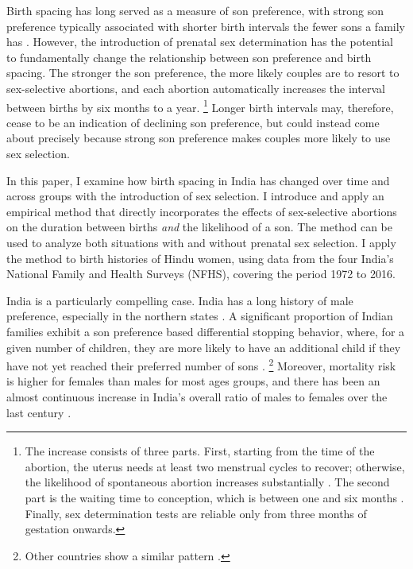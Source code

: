 \documentclass[12pt,letterpaper]{article}
\begin{document}
Birth spacing has long served as a measure of son preference, with strong
son preference typically associated with shorter birth intervals the
fewer sons a family has \citep{ben-porath76b,Leung1988}.
However, the introduction of prenatal sex determination has the potential to
fundamentally change the relationship between son preference and birth spacing.
The stronger the son preference, the more likely couples are to resort to sex-selective 
abortions, and each abortion automatically increases the interval between births by six 
months to a year.%
\footnote{
The increase consists of three parts.
First, starting from the time of the abortion, the uterus needs at 
least two menstrual cycles to recover;  otherwise, the likelihood 
of spontaneous abortion increases substantially \citep{zhou00b}.
The second part is the waiting time to conception, which is between 
one and six months \citep{Wang2003}.
Finally, sex determination tests are reliable only from three months 
of gestation onwards.
}
Longer birth intervals may, therefore, cease to be an indication of declining son
preference, but could instead come about precisely because strong son preference makes
couples more likely to use sex selection.

In this paper, I examine how birth spacing in India has changed over time and across 
groups with the introduction of sex selection.
I introduce and apply an empirical method that directly incorporates the effects of 
sex-selective abortions on the duration between births 
\emph{and} 
the likelihood of a son. 
The method can be used to analyze both situations with and without prenatal
sex selection.
I apply the method to birth histories of Hindu women, using data from the four
India's National Family and Health Surveys (NFHS), covering the period 
1972 to 2016. 


India is a particularly compelling case.
India has a long history of male preference, especially in the northern states 
\citep{Kishor1993,murthi95,arnold98}.
A significant proportion of Indian families exhibit a son preference based 
differential stopping behavior, where, for a given number of children, they are more 
likely to have an additional child if they have not yet reached their preferred number of 
sons \citep{repetto72,Das1987,Arnold1997,arnold98,clark00,Basu2010,Barcellos2014}.%
\footnote{
Other countries show a similar pattern
\citep[see, for example,][]{larsen98,filmer09,Altindag2016}.
}
Moreover, mortality risk is higher for females than males for most ages groups, and
there has been an almost continuous increase in India's overall ratio of males to females 
over the last century \citep{dyson01,Navaneetham2011,Bongaarts2015}.
\end{document}

